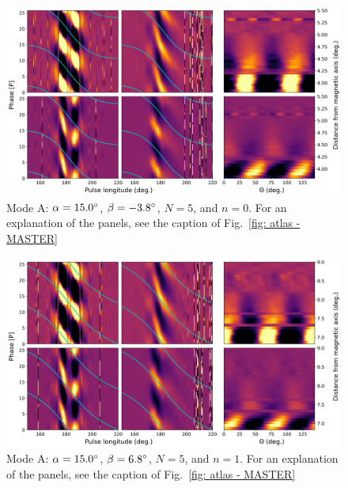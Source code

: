 \begin{figure}
	\begin{center}
		\includegraphics[width=\atlasHeightFrac\textwidth]{Figures/B0031/atlas/A_517015005000_plots}
		\caption[Atlas results: Mode A -- $\alpha=15.0\degr$, $\beta=-3.8\degr$, $N=5$, $n=0$]{Mode A: $\alpha=15.0\degr$, $\beta=-3.8\degr$, $N=5$, and $n=0$. For an explanation of the panels, see the caption of Fig.~\ref{fig: atlas - MASTER} }
		\label{fig: atlas - A_517015005000}
	\end{center}
\end{figure}

\begin{figure}
	\begin{center}
		\includegraphics[width=\atlasHeightFrac\textwidth]{Figures/B0031/atlas/A_517015005001_plots}
		\caption[Atlas results: Mode A -- $\alpha=15.0\degr$, $\beta=6.8\degr$, $N=5$, $n=1$]{Mode A: $\alpha=15.0\degr$, $\beta=6.8\degr$, $N=5$, and $n=1$. For an explanation of the panels, see the caption of Fig.~\ref{fig: atlas - MASTER} }
		\label{fig: atlas - A_517015005001}
	\end{center}
\end{figure}

